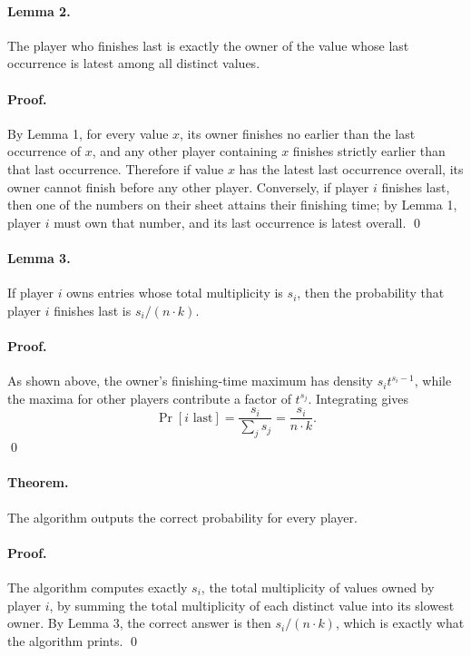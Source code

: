 \documentclass[11pt]{article}
\begin{document}
\paragraph{Lemma 2.}
The player who finishes last is exactly the owner of the value whose last occurrence is latest among all
distinct values.

\paragraph{Proof.}
By Lemma 1, for every value $x$, its owner finishes no earlier than the last occurrence of $x$, and any
other player containing $x$ finishes strictly earlier than that last occurrence. Therefore if value $x$ has the
latest last occurrence overall, its owner cannot finish before any other player. Conversely, if player $i$
finishes last, then one of the numbers on their sheet attains their finishing time; by Lemma 1, player $i$
must own that number, and its last occurrence is latest overall. \qed

\paragraph{Lemma 3.}
If player $i$ owns entries whose total multiplicity is $s_i$, then the probability that player $i$ finishes last
is $s_i / (n \cdot k)$.

\paragraph{Proof.}
As shown above, the owner's finishing-time maximum has density $s_i t^{s_i-1}$, while the maxima for
other players contribute a factor of $t^{s_j}$. Integrating gives
\[
    \Pr[i \text{ last}] = \frac{s_i}{\sum_j s_j} = \frac{s_i}{n \cdot k}.
\]
\qed

\paragraph{Theorem.}
The algorithm outputs the correct probability for every player.

\paragraph{Proof.}
The algorithm computes exactly $s_i$, the total multiplicity of values owned by player $i$, by summing the
total multiplicity of each distinct value into its slowest owner. By Lemma 3, the correct answer is then
$s_i / (n \cdot k)$, which is exactly what the algorithm prints. \qed
\end{document}
